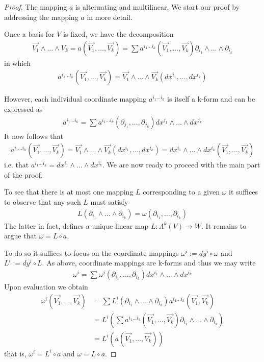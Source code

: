 \documentclass[12pt]{armath}
\newcommand{\ra}{\rightarrow}
\newcommand{\kp}[1]{\partial_{#1_1},\ldots,\partial_{#1_k}}
\newcommand{\kpw}[1]{\partial_{#1_1}\wedge\ldots\wedge\partial_{#1_k}}
\newcommand{\kdw}[1]{dx^{#1_1}\wedge\ldots\wedge dx^{#1_k}}
\begin{document}
\begin{proof}
  The mapping $a$ is alternating and multilinear. We start our proof by
  addressing the mapping $a$ in more detail.

  Once a basis for $V$ is fixed, we have the decomposition
  \begin{align*}
    \vec{V_1}\wedge\ldots\wedge{V_k}=a(\vec{V_1},\ldots,\vec{V_k})=\sum a^{i_1\ldots
    i_k}(\vec{V_1},\ldots,\vec{V_k})\partial_{i_1}\wedge\ldots\wedge\partial_{i_k}
  \end{align*}
  in which
  \begin{align*}
    a^{i_1\ldots
    i_k}(\vec{V_1},\ldots,\vec{V_k})=\vec{V_1}\wedge\ldots\wedge\vec{V_k}(dx^{i_1},\ldots,dx^{i_k})
  \end{align*}

  However, each individual coordinate mapping $a^{i_1\ldots i_k}$ is itself
  a k-form and can be expressed as
  \begin{align*}
    a^{i_1\ldots i_k}=\sum a^{i_1\ldots
    i_k}(\partial_{j_1},\ldots,\partial_{j_k})dx^{j_1}\wedge\ldots\wedge
    dx^{j_k}
  \end{align*}
  It now follows that
  \begin{align*}
    a^{i_1\ldots
    i_k}(\vec{V_1},\ldots,\vec{V_k})=\vec{V_1}\wedge\ldots\wedge\vec{V_k}(dx^{i_1},\ldots,dx^{i_k})=dx^{i_1}\wedge\ldots\wedge
    dx^{i_k}(\vec{V_1},\ldots,\vec{V_k})
  \end{align*}
  i.e. that $a^{i_1\ldots i_k}=dx^{i_1}\wedge\ldots\wedge dx^{i_k}$. We are
  now ready to proceed with the main part of the proof.

  To see that there is at most one mapping $L$ corresponding to a given
  $\omega$ it suffices to observe that any such $L$ must satisfy
  \begin{align*}
    L(\partial_{i_1}\wedge\ldots\wedge
    \partial_{i_k})=\omega(\partial_{i_1},\ldots,\partial_{i_k})
  \end{align*}
  The latter in fact, defines a unique linear map $L:\Lambda^k(V)\ra W$. It
  remains to argue that $\omega=L\circ a$.

  To do so it suffices to focus on the coordinate mappings $\omega^i :=
  dy^i\circ\omega$ and $L^i:=dy^i\circ L$. As above, coordinate mappings are
  k-forms and thus we may write
  \begin{align*}
    \omega^i=\sum \omega^i(\kp{i})\kdw{i}
  \end{align*}
  Upon evaluation we obtain
  \begin{align*}
    \omega^i(\vec{V_1},\ldots,\vec{V_k})&=\sum L^i(\kpw{i})a^{i_1\ldots
    i_k}(\vec{V_1},\vec{V_k})\\
                                        &=L^i\left(\sum a^{i_1\ldots
                                        i_k}(\vec{V_1},\ldots,\vec{V_k})\kpw{i}\right)\\
                                        &=L^i(a(\vec{V_1},\ldots,\vec{V_k}))
    \end{align*}
    that is, $\omega^i=L^i\circ a$ and $\omega=L\circ a$.


\end{proof}
\end{document}
